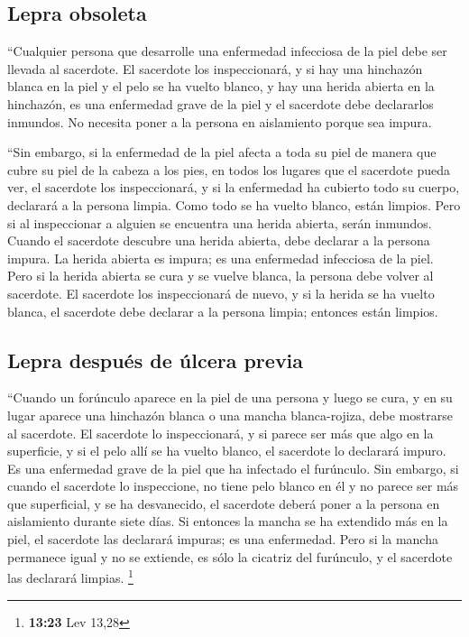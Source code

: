 \hypertarget{lepra-obsoleta}{%
\subsection{Lepra obsoleta}\label{lepra-obsoleta}}

 ``Cualquier persona que desarrolle una enfermedad
infecciosa de la piel debe ser llevada al sacerdote.  El
sacerdote los inspeccionará, y si hay una hinchazón blanca en la piel y
el pelo se ha vuelto blanco, y hay una herida abierta en la hinchazón,
 es una enfermedad grave de la piel y el sacerdote debe
declararlos inmundos. No necesita poner a la persona en aislamiento
porque sea impura.

 ``Sin embargo, si la enfermedad de la piel afecta a toda
su piel de manera que cubre su piel de la cabeza a los pies, en todos
los lugares que el sacerdote pueda ver,  el sacerdote los
inspeccionará, y si la enfermedad ha cubierto todo su cuerpo, declarará
a la persona limpia. Como todo se ha vuelto blanco, están limpios.
 Pero si al inspeccionar a alguien se encuentra una
herida abierta, serán inmundos.  Cuando el sacerdote
descubre una herida abierta, debe declarar a la persona impura. La
herida abierta es impura; es una enfermedad infecciosa de la piel.
 Pero si la herida abierta se cura y se vuelve blanca, la
persona debe volver al sacerdote.  El sacerdote los
inspeccionará de nuevo, y si la herida se ha vuelto blanca, el sacerdote
debe declarar a la persona limpia; entonces están limpios.

\hypertarget{lepra-despuuxe9s-de-uxfalcera-previa}{%
\subsection{Lepra después de úlcera
previa}\label{lepra-despuuxe9s-de-uxfalcera-previa}}

 ``Cuando un forúnculo aparece en la piel de una persona
y luego se cura,  y en su lugar aparece una hinchazón
blanca o una mancha blanca-rojiza, debe mostrarse al sacerdote.
 El sacerdote lo inspeccionará, y si parece ser más que
algo en la superficie, y si el pelo allí se ha vuelto blanco, el
sacerdote lo declarará impuro. Es una enfermedad grave de la piel que ha
infectado el furúnculo.  Sin embargo, si cuando el
sacerdote lo inspeccione, no tiene pelo blanco en él y no parece ser más
que superficial, y se ha desvanecido, el sacerdote deberá poner a la
persona en aislamiento durante siete días.  Si entonces
la mancha se ha extendido más en la piel, el sacerdote las declarará
impuras; es una enfermedad.  Pero si la mancha permanece
igual y no se extiende, es sólo la cicatriz del furúnculo, y el
sacerdote las declarará limpias. \footnote{\textbf{13:23} Lev 13,28}

